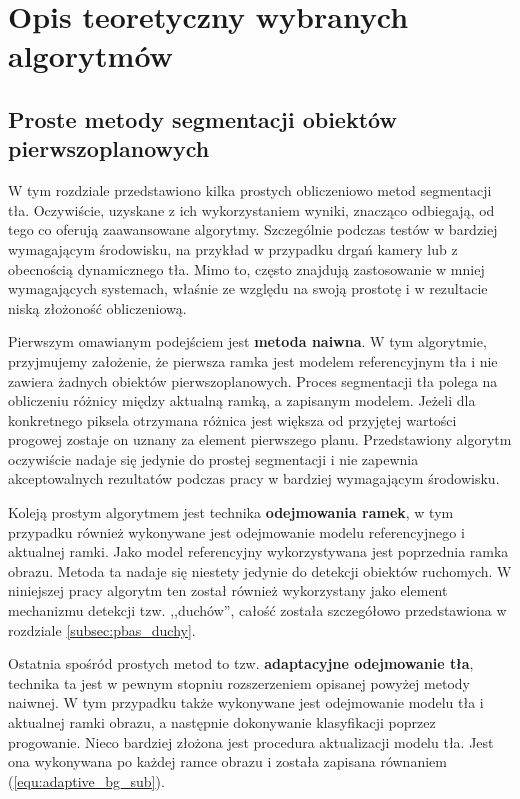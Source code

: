 \chapter{Opis teoretyczny wybranych algorytmów}
\label{cha:opis_teoretyczny_wybranych_algorytmow}

\section{Proste metody segmentacji obiektów pierwszoplanowych}
\label{sec:proste_metody}

W tym rozdziale przedstawiono kilka prostych obliczeniowo metod segmentacji tła. Oczywiście, uzyskane z ich wykorzystaniem wyniki, znacząco odbiegają, od tego co oferują zaawansowane algorytmy. Szczególnie podczas testów w bardziej wymagającym środowisku, na przykład w przypadku drgań kamery lub z obecnością dynamicznego tła. %
Mimo to, często znajdują zastosowanie w mniej wymagających systemach, właśnie ze względu na swoją prostotę i w rezultacie niską złożoność obliczeniową.

Pierwszym omawianym podejściem jest \textbf{metoda naiwna}. 
W tym algorytmie, przyjmujemy założenie, że pierwsza ramka jest modelem referencyjnym tła i nie zawiera żadnych obiektów pierwszoplanowych. 
Proces segmentacji tła polega na obliczeniu różnicy między aktualną ramką, a zapisanym modelem. 
Jeżeli dla konkretnego piksela otrzymana różnica jest większa od przyjętej wartości progowej zostaje on uznany za element pierwszego planu. 
Przedstawiony algorytm oczywiście nadaje się jedynie do prostej segmentacji i nie zapewnia akceptowalnych rezultatów podczas pracy w bardziej wymagającym środowisku.

Koleją prostym algorytmem jest technika \textbf{odejmowania ramek}, w tym przypadku również wykonywane jest odejmowanie modelu referencyjnego i aktualnej ramki. 
Jako model referencyjny wykorzystywana jest poprzednia ramka obrazu. 
Metoda ta nadaje się niestety jedynie do detekcji obiektów ruchomych. 
W niniejszej pracy algorytm ten został również wykorzystany jako element mechanizmu detekcji tzw. ,,duchów'', całość została szczegółowo przedstawiona w rozdziale \ref{subsec:pbas_duchy}.

Ostatnia spośród prostych metod to tzw. \textbf{adaptacyjne odejmowanie tła}, technika ta jest w pewnym stopniu rozszerzeniem opisanej powyżej metody naiwnej. 
W tym przypadku także wykonywane jest odejmowanie modelu tła i aktualnej ramki obrazu, a następnie dokonywanie klasyfikacji poprzez progowanie. 
Nieco bardziej złożona jest procedura aktualizacji modelu tła. 
Jest ona wykonywana po każdej ramce obrazu i została zapisana równaniem (\ref{equ:adaptive_bg_sub}).

